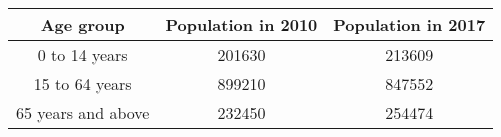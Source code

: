 \begin{tabular}{|c|c|c|}
\hline
\textbf{Age group} & \textbf{Population in 2010} & \textbf{Population in 2017} \\
\hline
0 to 14 years & 201630 & 213609 \\
\hline
15 to 64 years & 899210 & 847552 \\
\hline
65 years and above & 232450 & 254474 \\
\hline
\end{tabular}